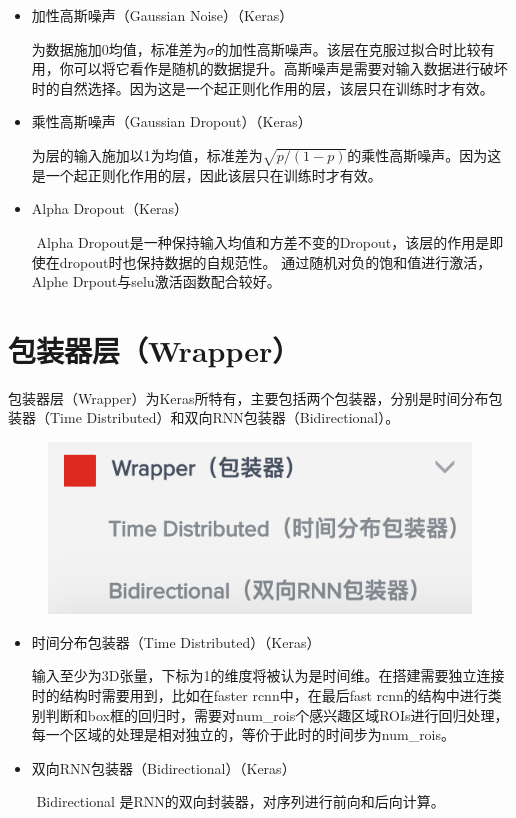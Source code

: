 \documentclass{progbookcn}
\begin{document}
\begin{itemize}
\item 加性高斯噪声（Gaussian Noise）（Keras）

  ​	为数据施加0均值，标准差为$\sigma$的加性高斯噪声。该层在克服过拟合时比较有用，你可以将它看作是随机的数据提升。高斯噪声是需要对输入数据进行破坏时的自然选择。因为这是一个起正则化作用的层，该层只在训练时才有效。

\item 乘性高斯噪声（Gaussian Dropout）（Keras）

  为层的输入施加以1为均值，标准差为$\sqrt{p/(1-p)}$的乘性高斯噪声。因为这是一个起正则化作用的层，因此该层只在训练时才有效。

\item Alpha Dropout（Keras）	

  ​	Alpha Dropout是一种保持输入均值和方差不变的Dropout，该层的作用是即使在dropout时也保持数据的自规范性。 通过随机对负的饱和值进行激活，Alphe Drpout与selu激活函数配合较好。
\end{itemize}


\section{  包装器层（Wrapper）}

包装器层（Wrapper）为Keras所特有，主要包括两个包装器，分别是时间分布包装器（Time Distributed）和双向RNN包装器（Bidirectional）。
\begin{figure}[H]
  \centering
  \includegraphics[scale = 0.6]{Wrapper_layer.png}
\end{figure}

\begin{itemize}
\item 时间分布包装器（Time Distributed）（Keras）	

  ​	输入至少为3D张量，下标为1的维度将被认为是时间维。在搭建需要独立连接时的结构时需要用到，比如在faster rcnn中，在最后fast rcnn的结构中进行类别判断和box框的回归时，需要对num\_rois个感兴趣区域ROIs进行回归处理，每一个区域的处理是相对独立的，等价于此时的时间步为num\_rois。

\item 双向RNN包装器（Bidirectional）（Keras）	

  ​	Bidirectional 是RNN的双向封装器，对序列进行前向和后向计算。
\end{itemize}
\end{document}
